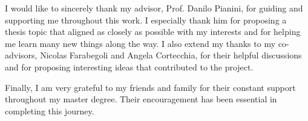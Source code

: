 \documentclass[12pt,a4paper,openright,twoside]{book}
\begin{document}
\nocite{*} %




\begin{acknowledgements}
I would like to sincerely thank my advisor, Prof. Danilo Pianini, for guiding
and supporting me throughout this work. I especially thank him for proposing a
thesis topic that aligned as closely as possible with my interests and for
helping me learn many new things along the way. I also extend my thanks to my
co-advisors, Nicolas Farabegoli and Angela Cortecchia, for their helpful
discussions and for proposing interesting ideas that contributed to the project.

Finally, I am very grateful to my friends and family for their constant support
throughout my master degree. Their encouragement has been essential in
completing this journey.
\end{acknowledgements}
\end{document}
